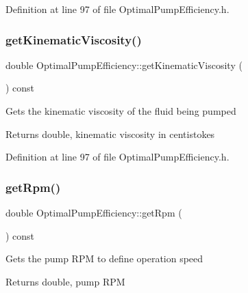 Definition at line 97 of file Optimal\+Pump\+Efficiency.\+h.

\mbox{\label{class_optimal_pump_efficiency_a8c2f7fcacce2b42ed83f29aec2d4671e}} 
\subsubsection{\texorpdfstring{get\+Kinematic\+Viscosity()}{getKinematicViscosity()}\hspace{0.1cm}{\footnotesize\ttfamily [3/3]}}
{\footnotesize\ttfamily double Optimal\+Pump\+Efficiency\+::get\+Kinematic\+Viscosity (\begin{DoxyParamCaption}{ }\end{DoxyParamCaption}) const\hspace{0.3cm}{\ttfamily [inline]}}

Gets the kinematic viscosity of the fluid being pumped \begin{DoxyReturn}{Returns}
double, kinematic viscosity in centistokes 
\end{DoxyReturn}


Definition at line 97 of file Optimal\+Pump\+Efficiency.\+h.

\mbox{\label{class_optimal_pump_efficiency_a58e8a430ced612e0518abd07fb30b085}} 
\subsubsection{\texorpdfstring{get\+Rpm()}{getRpm()}\hspace{0.1cm}{\footnotesize\ttfamily [1/3]}}
{\footnotesize\ttfamily double Optimal\+Pump\+Efficiency\+::get\+Rpm (\begin{DoxyParamCaption}{ }\end{DoxyParamCaption}) const\hspace{0.3cm}{\ttfamily [inline]}}

Gets the pump R\+PM to define operation speed \begin{DoxyReturn}{Returns}
double, pump R\+PM 
\end{DoxyReturn}


